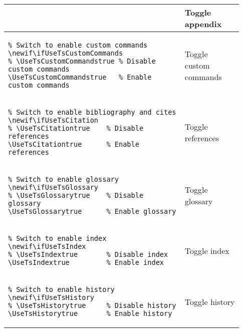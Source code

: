 \begin{footnotesize}
\begin{longtable}{ | P{0.7\linewidth} | p{0.23\linewidth} | }
         & Toggle appendix                                                     \\
        \hline
        \begin{BVerbatim}
\newif\ifUseTsCustomCommands
\UseTsCustomCommandstrue   %
        \end{BVerbatim}
         & Toggle custom commands                                              \\
        \hline
        \begin{BVerbatim}
\newif\ifUseTsCitation
\UseTsCitationtrue      %
        \end{BVerbatim}
         & Toggle references                                                   \\
        \hline
        \begin{BVerbatim}
\newif\ifUseTsGlossary
\UseTsGlossarytrue      %
        \end{BVerbatim}
         & Toggle glossary                                                     \\
        \hline
        \begin{BVerbatim}
\newif\ifUseTsIndex
\UseTsIndextrue         %
        \end{BVerbatim}
         & Toggle index                                                        \\
        \hline
        \begin{BVerbatim}
\newif\ifUseTsHistory
\UseTsHistorytrue       %
        \end{BVerbatim}
         & Toggle history                                                      \\
        \hline

\end{longtable}
\end{footnotesize}
